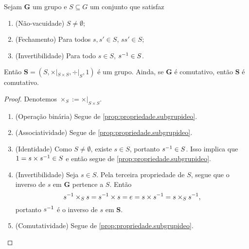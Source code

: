 \begin{proposition}
\label{prop:propriedade.subgrupo}
Sejam $\bm G$ um grupo e $S \subseteq G$ um conjunto que satisfaz
	\begin{enumerate}[label=\textbf{SG\arabic*.},ref={SG\arabic*}]
	\item \label{SG1} (Não-vacuidade) $S \neq \emptyset$;
	\item \label{SG2} (Fechamento) Para todos $s,s' \in S$, $ss' \in S$;
	\item \label{SG3} (Invertibilidade) Para todo $s \in S$,  $s^{-1} \in S$.
	\end{enumerate}
\noindent
Então $\bm S=(S,\times|_{S \times S}, \div|_S,1)$ é um grupo. Ainda, se $\bm G$ é comutativo, então $\bm S$ é comutativo.
\end{proposition}
\begin{proof}
Denotemos $\times_S := \times|_{S \times S}$.
	\begin{enumerate}
	\item (Operação binária) Segue de \ref{prop:propriedade.subgrupideo}.

	\item (Associatividade) Segue de \ref{prop:propriedade.subgrupideo}.

	\item (Identidade) Como $S \neq \emptyset$, existe $s \in S$, portanto $s^{-1} \in S$. Isso implica que $1=s \times s^{-1} \in S$ e então segue de \ref{prop:propriedade.subgrupideo}.

	\item (Invertibilidade) Seja $s \in S$. Pela terceira propriedade de $S$, segue que o inverso de $s$ em $\bm G$ pertence a $S$. Então
		\begin{equation*}
		s^{-1} \times_S s = s^{-1} \times s = e = s \times s^{-1} = s \times_S s^{-1},
		\end{equation*}
	portanto $s^{-1}$ é o inverso de $s$ em $\bm S$.

	\item (Comutatividade) Segue de \ref{prop:propriedade.subgrupideo}.
	\end{enumerate}
\end{proof}

